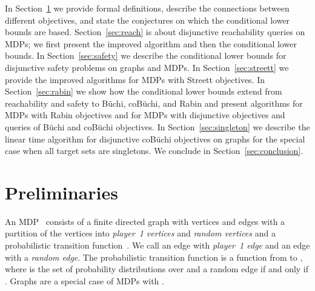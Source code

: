 \documentclass[11pt,letterpaper]{article}
\newcommand{\lu}{\textup{(}}
\newcommand{\ru}{\textup{)}\xspace}
\newcommand{\upbr}[1]{\lu #1\ru}
\newif\iffullversion
\newcommand{\infull}[1]{\iffullversion #1\fi}
\begin{document}
\smallskip{}
In Section~\ref{sec:prelim} we provide formal definitions, describe the connections
between different objectives, and state the 
conjectures on which the conditional lower bounds are based.
Section~\ref{sec:reach} is about disjunctive reachability queries on MDPs; we 
first present the improved algorithm and then the conditional lower bounds.
In Section~\ref{sec:safety} we describe the conditional lower bounds for disjunctive
safety problems on graphs and MDPs. In Section~\ref{sec:streett} we provide
the improved algorithms for MDPs with Streett objectives. In Section~\ref{sec:rabin}
we show how the conditional lower bounds extend from reachability and safety
to Büchi, coBüchi, and Rabin and present algorithms for MDPs with Rabin objectives and 
for MDPs with disjunctive objectives and queries of Büchi and coBüchi objectives.
In Section~\ref{sec:singleton} we describe the linear time algorithm for disjunctive
coBüchi objectives on graphs for the special case when all target sets are singletons.
We conclude in Section~\ref{sec:conclusion}.
\section{Preliminaries}\label{sec:prelim}
\smallskip\noindent{\em Markov Decision Processes \upbr{MDPs} and Graphs.} 
An MDP~ consists of a finite directed 
graph with vertices  and edges  with a partition of the vertices into 
\emph{player~1 vertices}  and \emph{random vertices}  and a 
probabilistic transition function~. We call an edge  with 
\emph{player~1 edge} and an edge  with  a \emph{random edge}.
The probabilistic transition function is a function from  to , 
where  is the set of probability distributions over  and 
a random edge  if and only if .\infull{ For the purpose
of this paper we assume for simplicity that, for each random vertex , 
 is the uniform distribution over all  with ; this is w.l.o.g.\ as we are only ask whether a probability is zero or one 
(qualitative analysis) or zero or larger than zero.} Graphs are a special case
of MDPs with .
\infull{

\smallskip\noindent{\em Sub-MDPs and Maximal End-Components.}
A sub-MDP of an MDP  induced by a vertex set  
is defined as , where  
is for each  the uniform distribution over all  
with .
An \emph{end-component} \upbr{EC} of an MDP  is a set of 
vertices  such that \upbr{a} the induced sub-MDP 

is strongly connected, \upbr{b} all outgoing edges in  of vertices in 
 are contained in , and \upbr{c}  contains at least one edge.
An end-component is a \emph{maximal end-component} \upbr{MEC} if it is maximal 
under set inclusion.
An end-component is \emph{trivial} if it consists of a single vertex \upbr{with
a self-loop}, otherwise it is \emph{non-trivial}.
The \emph{MEC-decomposition} of an MDP consists of all MECs of the MDP and the 
set of vertices that do not belong to any MEC.
}
\end{document}
